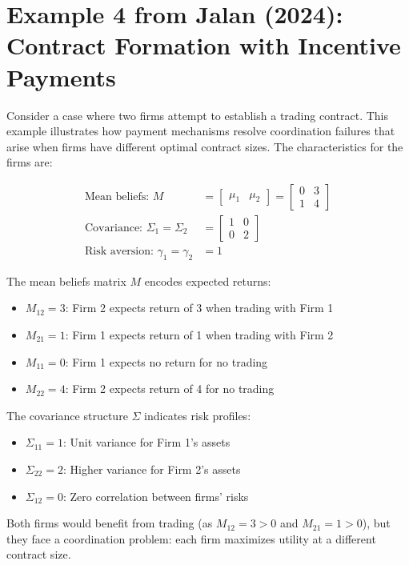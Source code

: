\section{Example 4 from Jalan (2024): Contract Formation with Incentive Payments}

Consider a case where two firms attempt to establish a trading contract. This example illustrates how payment mechanisms resolve coordination failures that arise when firms have different optimal contract sizes. The characteristics for the firms are:

\begin{align}
    \text{Mean beliefs: } M &= \begin{bmatrix} \mu_1 & \mu_2\end{bmatrix}= \begin{bmatrix} 0 & 3 \\ 1 & 4 \end{bmatrix} \\
    \text{Covariance: } \Sigma_1 = \Sigma_2 &= \begin{bmatrix} 1 & 0 \\ 0 & 2 \end{bmatrix} \\
    \text{Risk aversion: } \gamma_1 = \gamma_2 &= 1
\end{align}

The mean beliefs matrix $M$ encodes expected returns:
\begin{itemize}
    \item $M_{12} = 3$: Firm 2 expects return of 3 when trading with Firm 1
    \item $M_{21} = 1$: Firm 1 expects return of 1 when trading with Firm 2
    \item $M_{11} = 0$: Firm 1 expects no return for no trading
    \item $M_{22} = 4$: Firm 2 expects return of 4 for no trading
\end{itemize}

The covariance structure $\Sigma$ indicates risk profiles:
\begin{itemize}
    \item $\Sigma_{11} = 1$: Unit variance for Firm 1's assets
    \item $\Sigma_{22} = 2$: Higher variance for Firm 2's assets
    \item $\Sigma_{12} = 0$: Zero correlation between firms' risks
\end{itemize}

Both firms would benefit from trading (as $M_{12} = 3 > 0$ and $M_{21} = 1 > 0$), but they face a coordination problem: each firm maximizes utility at a different contract size.

